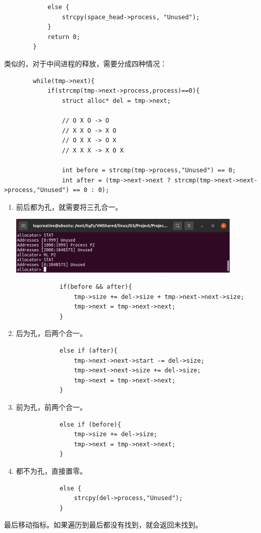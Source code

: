 \documentclass[12pt,a4paper]{article}
\newenvironment{problems}{\begin{list}{}{\renewcommand{\makelabel}[1]{\textbf{##1}\hfil}}}{\end{list}}
\begin{document}
\begin{problems}
\begin{enumerate}
        \begin{lstlisting}
            else {
                strcpy(space_head->process, "Unused");
            }
            return 0;
        }
        \end{lstlisting}
    \end{enumerate}

    类似的，对于中间进程的释放，需要分成四种情况：
    \begin{lstlisting}
        while(tmp->next){
            if(strcmp(tmp->next->process,process)==0){
                struct alloc* del = tmp->next;
    
                // O X O -> O
                // X X O -> X O
                // O X X -> O X
                // X X X -> X O X

                int before = strcmp(tmp->process,"Unused") == 0;
                int after = (tmp->next->next ? strcmp(tmp->next->next->process,"Unused") == 0 : 0);
    \end{lstlisting}
    \begin{enumerate}
        \item 前后都为孔，就需要将三孔合一。
        
        \includegraphics[width=0.88\textwidth]{RL21.png}

        \begin{lstlisting}
            if(before && after){
                tmp->size += del->size + tmp->next->next->size;
                tmp->next = tmp->next->next;
            }
        \end{lstlisting}
        \item 后为孔，后两个合一。
        \begin{lstlisting}
            else if (after){
                tmp->next->next->start -= del->size;
                tmp->next->next->size += del->size;
                tmp->next = tmp->next->next;
            }
        \end{lstlisting}
        \item 前为孔，前两个合一。
        \begin{lstlisting}
            else if (before){
                tmp->size += del->size;
                tmp->next = tmp->next->next;
            }
        \end{lstlisting}
        \item 都不为孔，直接置零。
        \begin{lstlisting}
            else {
                strcpy(del->process,"Unused");
            }
        \end{lstlisting}
    \end{enumerate}
    最后移动指标。如果遍历到最后都没有找到，就会返回未找到。
    

\end{problems}
\end{document}
